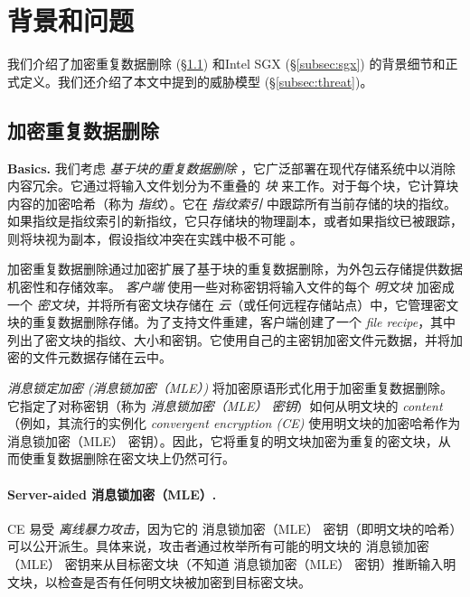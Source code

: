 \section{背景和问题}
\label{sec:background}

我们介绍了加密重复数据删除 (\S\ref{subsec:encrypted-dedup}) 和Intel SGX (\S\ref{subsec:sgx}) 的背景细节和正式定义。我们还介绍了本文中提到的威胁模型 (\S\ref{subsec:threat})。

\subsection{加密重复数据删除}
\label{subsec:encrypted-dedup}

\noindent
{\bf Basics.} 我们考虑 \textit{ 基于块的重复数据删除} \cite{zhu08,wallace12,meyer11}，它广泛部署在现代存储系统中以消除内容冗余。它通过将输入文件划分为不重叠的 \textit{ 块} 来工作。对于每个块，它计算块内容的加密哈希（称为 \textit{ 指纹}）。它在 \textit{ 指纹索引} 中跟踪所有当前存储的块的指纹。如果指纹是指纹索引的新指纹，它只存储块的物理副本，或者如果指纹已被跟踪，则将块视为副本，假设指纹冲突在实践中极不可能 \cite{black06}。
   
加密重复数据删除通过加密扩展了基于块的重复数据删除，为外包云存储提供数据机密性和存储效率。 \textit{ 客户端} 使用一些对称密钥将输入文件的每个 \textit{ 明文块} 加密成一个 \textit{ 密文块}，并将所有密文块存储在 \textit{ 云}（或任何远程存储站点）中，它管理密文块的重复数据删除存储。为了支持文件重建，客户端创建了一个 \textit{ file recipe}，其中列出了密文块的指纹、大小和密钥。它使用自己的主密钥加密文件元数据，并将加密的文件元数据存储在云中。

\textit{ 消息锁定加密 (消息锁加密（MLE）)} \cite{bellare13a} 将加密原语形式化用于加密重复数据删除。它指定了对称密钥（称为 \textit{ 消息锁加密（MLE） 密钥}）如何从明文块的 \textit{ content}（例如，其流行的实例化 \textit{ convergent encryption (CE)} \cite{douceur02}使用明文块的加密哈希作为 消息锁加密（MLE） 密钥）。因此，它将重复的明文块加密为重复的密文块，从而使重复数据删除在密文块上仍然可行。

\paragraph{Server-aided 消息锁加密（MLE）.} CE 易受 \textit{ 离线暴力攻击}，因为它的 消息锁加密（MLE） 密钥（即明文块的哈希）可以公开派生。具体来说，攻击者通过枚举所有可能的明文块的 消息锁加密（MLE） 密钥来从目标密文块（不知道 消息锁加密（MLE） 密钥）推断输入明文块，以检查是否有任何明文块被加密到目标密文块。


